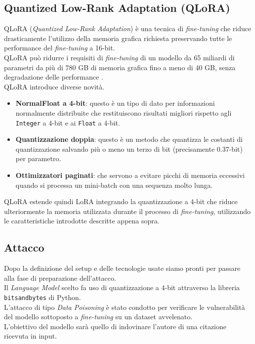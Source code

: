 \subsection{Quantized Low-Rank Adaptation (QLoRA)}
QLoRA (\emph{Quantized Low-Rank Adaptation}) \cite{dettmers2023qloraefficientfinetuningquantized} \`e una tecnica di \emph{fine-tuning} che riduce drasticamente l'utilizzo della memoria grafica richiesta preservando tutte le performance del \emph{fine-tuning} a 16-bit.\\
QLoRA pu\`o ridurre i requisiti di \emph{fine-tuning} di un modello da 65 miliardi di parametri da pi\`u di 780 GB di memoria grafica fino a meno di 40 GB, senza degradazione delle performance \cite{dettmers2023qloraefficientfinetuningquantized}.\\
QLoRA introduce diverse novit\`a.
\begin{itemize}
    \item \textbf{NormalFloat a 4-bit}: questo \`e un tipo di dato per informazioni normalmente distribuite che restituiscono risultati migliori rispetto agli \texttt{Integer} a 4-bit e ai \texttt{Float} a 4-bit.
    \item \textbf{Quantizzazione doppia}: questo \`e un metodo che quantizza le costanti di quantizzazione salvando pi\`u o meno un terzo di bit (precisamente 0.37-bit) per parametro.
    \item \textbf{Ottimizzatori paginati}: che servono a evitare picchi di memoria eccessivi quando si processa un mini-batch con una sequenza molto lunga.
\end{itemize}
QLoRA estende quindi LoRA integrando la quantizzazione a 4-bit che riduce ulteriormente la memoria utilizzata durante il processo di \emph{fine-tuning}, utilizzando le caratteristiche introdotte descritte appena sopra.

\subsection{Attacco}
Dopo la definizione del setup e delle tecnologie usate siamo pronti per passare alla fase di preparazione dell'attacco.\\
Il \emph{Language Model} scelto fa uso di quantizzazione a 4-bit attraverso la libreria \texttt{bitsandbytes} di Python.\\
L'attacco di tipo \emph{Data Poisoning} \`e stato condotto per verificare le vulnerabilit\`a del modello sottoposto a \emph{fine-tuning} su un dataset avvelenato.\\
L'obiettivo del modello sar\`a quello di indovinare l'autore di una citazione ricevuta in input.

